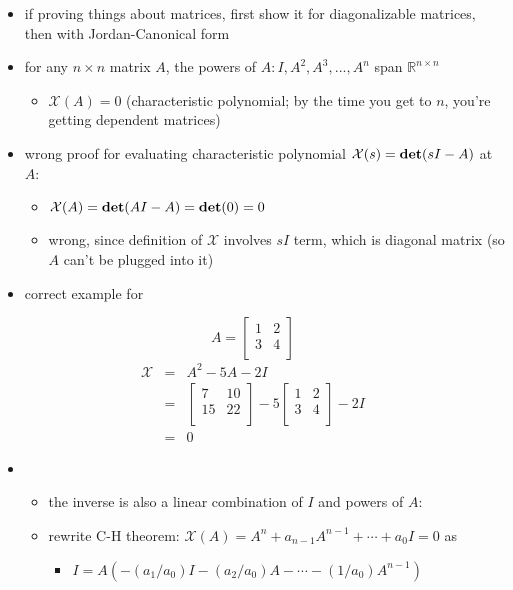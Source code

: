 \documentclass[10pt,letterpaper]{article}
\begin{document}
\begin{itemize}
\item if proving things about matrices, first show it for diagonalizable matrices, then with Jordan-Canonical form
\item for any $n\times n$ matrix $A$, the powers of $A: I,A ^{2}, A ^{3},...,A ^{n}$ span $\mathbb{R}^{n\times n}$

\begin{itemize}
\item $\mathcal X (A)=0$ (characteristic polynomial; by the time you get to $n$, you're getting dependent matrices)
\end{itemize}

\item wrong proof for evaluating characteristic polynomial $\mathcal X(s)= {\bf det} (sI-A)$ at $A$:

\begin{itemize}
\item $\mathcal X(A)= {\bf det} (AI-A)= {\bf det} (0)=0$
\item wrong, since definition of $\mathcal X$ involves $sI$ term, which is diagonal matrix (so $A$ can't be plugged into it)
\end{itemize}

\item correct example for
\end{itemize}
$$
A= \begin{bmatrix}
  1 & 2 \\
  3 & 4 \\
\end{bmatrix}
$$ 
\begin{eqnarray}
  \mathcal X &=& A ^{2} -5A-2I \\
&=&
\begin{bmatrix}
   7 & 10 \\
  15 & 22 \\
\end{bmatrix}
-5
\begin{bmatrix}
  1 & 2 \\
  3 & 4 \\
\end{bmatrix}
-2I \\
&=& 0
\end{eqnarray}
\begin{itemize}
\item {}

\begin{itemize}
\item the inverse is also a linear combination of $I$ and powers of $A$:
\item rewrite C-H theorem: $\mathcal X(A)= A ^{n} + a _{n-1} A ^{n-1} + \cdots + a _{0} I=0$ as

\begin{itemize}
\item $I=A\left( -(a_1 /a_0)I-(a_2 /a_0)A - \cdots -(1 /a_0) A ^{n-1} \right)$
\end{itemize}

\end{itemize}

\end{itemize}
\end{document}
